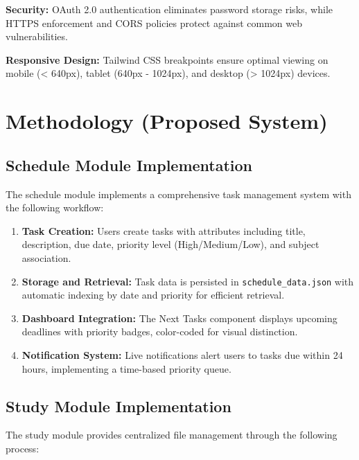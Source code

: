 \documentclass[12pt]{article}
\begin{document}
\textbf{Security:} OAuth 2.0 authentication eliminates password storage risks, while HTTPS enforcement and CORS policies protect against common web vulnerabilities.

\textbf{Responsive Design:} Tailwind CSS breakpoints ensure optimal viewing on mobile (< 640px), tablet (640px - 1024px), and desktop (> 1024px) devices.

\section{Methodology (Proposed System)}
\subsection{Schedule Module Implementation}
The schedule module implements a comprehensive task management system with the following workflow:

\begin{enumerate}
    \item \textbf{Task Creation:} Users create tasks with attributes including title, description, due date, priority level (High/Medium/Low), and subject association.
    
    \item \textbf{Storage and Retrieval:} Task data is persisted in \texttt{schedule\_data.json} with automatic indexing by date and priority for efficient retrieval.
    
    \item \textbf{Dashboard Integration:} The Next Tasks component displays upcoming deadlines with priority badges, color-coded for visual distinction.
    
    \item \textbf{Notification System:} Live notifications alert users to tasks due within 24 hours, implementing a time-based priority queue.
\end{enumerate}

\subsection{Study Module Implementation}
The study module provides centralized file management through the following process:
\end{document}
